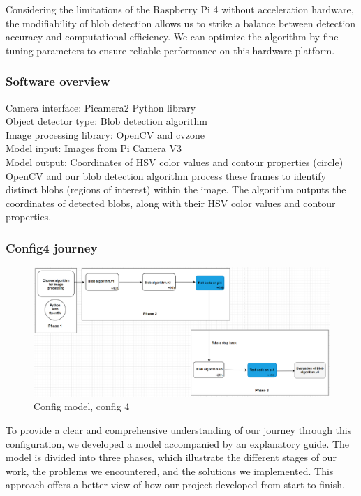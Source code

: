 Considering the limitations of the Raspberry Pi 4 without acceleration hardware, the modifiability of blob detection allows us to strike a balance between detection accuracy and computational efficiency. We can optimize the algorithm by fine-tuning parameters to ensure reliable performance on this hardware platform. 

\subsubsection{Software overview}

Camera interface: Picamera2 Python library\\
Object detector type: Blob detection algorithm\\
Image processing library: OpenCV and cvzone\\
Model input: Images from Pi Camera V3\\
Model output: Coordinates of HSV color values and contour properties (circle)\\

OpenCV and our blob detection algorithm process these frames to identify distinct blobs (regions of interest) within the image. The algorithm outputs the coordinates of detected blobs, along with their HSV color values and contour properties. 

\subsubsection{Config4 journey}

\begin{figure}[H]
    \centering
    \includegraphics[scale=0.5]{fig/config4model.png}
    \caption{Config model, config 4}
    \label{fig:config4_model}
\end{figure}

To provide a clear and comprehensive understanding of our journey through this configuration, we developed a model accompanied by an explanatory guide. The model is divided into three phases, which illustrate the different stages of our work, the problems we encountered, and the solutions we implemented. This approach offers a better view of how our project developed from start to finish. 

